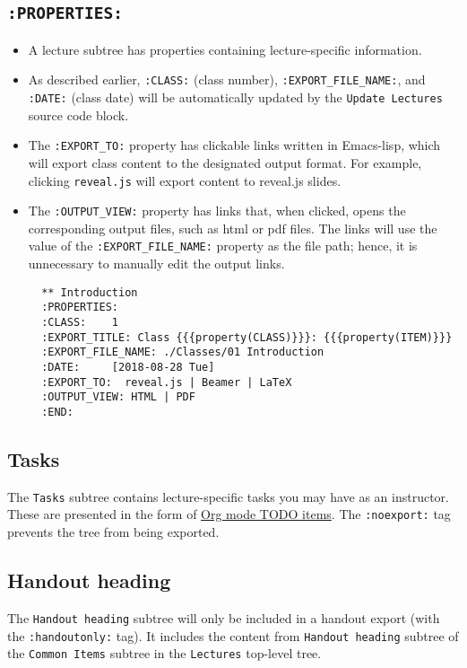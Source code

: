 \documentclass[10pt,article]{article}
\begin{document}
\subsection{\texttt{:PROPERTIES:}}
\label{sec:orgfffbf61}
\begin{itemize}
\item A lecture subtree has properties containing lecture-specific information.
\item As described earlier, \texttt{:CLASS:} (class number), \texttt{:EXPORT\_FILE\_NAME:}, and \texttt{:DATE:} (class date) will be
automatically updated by the \texttt{Update Lectures} source code block.
\item The \texttt{:EXPORT\_TO:} property has clickable links written in Emacs-lisp, which will
export class content to the designated output format. For example, clicking
\texttt{reveal.js} will export content to reveal.js slides.
\item The \texttt{:OUTPUT\_VIEW:} property has links that, when clicked,
opens the corresponding output files, such as html or pdf files. The
links will use the value of the \texttt{:EXPORT\_FILE\_NAME:} property as the
file path; hence, it is unnecessary to manually edit the output
links.

{\small
\begin{verbatim}
  ** Introduction
  :PROPERTIES:
  :CLASS:    1
  :EXPORT_TITLE: Class {{{property(CLASS)}}}: {{{property(ITEM)}}}
  :EXPORT_FILE_NAME: ./Classes/01 Introduction
  :DATE:     [2018-08-28 Tue]
  :EXPORT_TO:  reveal.js | Beamer | LaTeX 
  :OUTPUT_VIEW: HTML | PDF
  :END:
\end{verbatim}
}
\end{itemize}
\subsection{Tasks}
\label{sec:org94f68b4}
The \texttt{Tasks} subtree contains lecture-specific tasks you may have as an
instructor. These are presented in the form of \href{https://orgmode.org/manual/TODO-items.html}{Org mode TODO
items}. The \texttt{:noexport:} tag prevents the tree from being exported.
\subsection{Handout heading}
\label{sec:orge949136}
The \texttt{Handout heading} subtree will only be included in a handout export (with the
\texttt{:handoutonly:} tag). It includes the content from \texttt{Handout heading} subtree of the 
\texttt{Common Items} subtree in the \texttt{Lectures} top-level tree.
\end{document}
